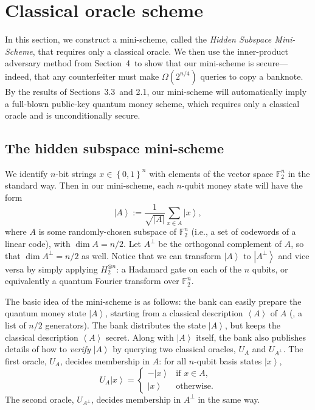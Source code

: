 \section{Classical oracle scheme\label{COR}}

In this section, we construct a mini-scheme, called the \emph{Hidden
Subspace Mini-Scheme}, that requires only a classical oracle. We then use
the inner-product adversary method from Section~4\ to show that our
mini-scheme is secure---indeed, that any counterfeiter must make
$\Omega\left(  2^{n/4}\right)  $ queries to copy a banknote. By the results
of Sections~3.3\ and 2.1, our mini-scheme will
automatically imply a full-blown public-key quantum money scheme, which
requires only a classical oracle and is unconditionally secure.

\subsection{The hidden subspace mini-scheme\label{HSM}}

We identify $n$-bit strings $x\in\left\{  0,1\right\}  ^{n}$ with elements of
the vector space $\mathbb{F}_{2}^{n}$ in the standard way. Then in our
mini-scheme, each $n$-qubit money state will have the form%
\[
\left\vert A\right\rangle :=\frac{1}{\sqrt{\left\vert A\right\vert }}%
\sum_{x\in A}\left\vert x\right\rangle ,
\]
where $A$ is some randomly-chosen subspace of $\mathbb{F}_{2}^{n}$ (i.e., a
set of codewords of a linear code), with $\dim A=n/2$. Let $A^{\bot}$ be
the orthogonal complement of $A$, so that $\dim A^{\bot}=n/2$ as
well. Notice that we can transform $\left\vert A\right\rangle $ to
$\left\vert A^{\bot}\right\rangle $ and vice versa by simply applying
$H_{2}^{\otimes n}$: a Hadamard gate on each of the $n$ qubits, or
equivalently a quantum Fourier transform over $\mathbb{F}_{2}^{n}$.

The basic idea of the mini-scheme is as follows: the bank can easily prepare
the quantum money state $\left\vert A\right\rangle $, starting from a
classical description $\left\langle A\right\rangle $ of $A$ (\eg, a list of
$n/2$ generators). The bank distributes the state $\left\vert
A\right\rangle $, but keeps the classical description $\left\langle
A\right\rangle $ secret. Along with $\left\vert A\right\rangle $ itself,
the bank also publishes details of how to \emph{verify} $\left\vert
A\right\rangle $ by querying two classical oracles, $U_{A}$ and $U_{A^{\bot}%
}$. The first oracle, $U_{A}$, decides membership in $A$: for all $n$-qubit
basis states $\left\vert x\right\rangle $,%
\[
U_{A}\left\vert x\right\rangle =
\begin{cases}
-\left\vert x\right\rangle  & \text{if $x\in A$,}\\
\left\vert x\right\rangle  & \text{otherwise.}%
\end{cases}
\]
The second oracle, $U_{A^{\bot}}$, decides membership in $A^{\bot}$ in the
same way.

